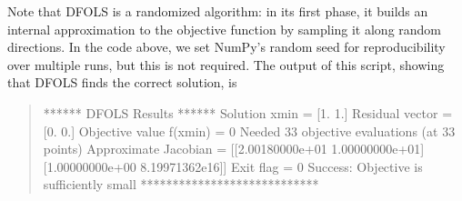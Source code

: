 \documentclass[letterpaper,10pt,english]{sphinxmanual}
\begin{document}
\begin{quote}

\begin{sphinxVerbatim}[commandchars=\\\{\}]
   
   
 

 
     \PYG{p}{[}  \PYG{p}{[}\PYG{p}{]}  \PYG{p}{[}\PYG{p}{]}     \PYG{p}{[}\PYG{p}{]}\PYG{p}{]}

  \PYG{p}{[} \PYG{p}{]}

   

\end{sphinxVerbatim}
\end{quote}

Note that DFO\sphinxhyphen{}LS is a randomized algorithm: in its first phase, it builds an internal approximation to the objective function by sampling it along random directions. In the code above, we set NumPy’s random seed for reproducibility over multiple runs, but this is not required. The output of this script, showing that DFO\sphinxhyphen{}LS finds the correct solution, is
\begin{quote}

\begin{sphinxVerbatim}[commandchars=\\\{\}]
****** DFO\PYGZhy{}LS Results ******
Solution xmin = [1. 1.]
Residual vector = [0. 0.]
Objective value f(xmin) = 0
Needed 33 objective evaluations (at 33 points)
Approximate Jacobian = [[\PYGZhy{}2.00180000e+01  1.00000000e+01]
 [\PYGZhy{}1.00000000e+00  8.19971362e\PYGZhy{}16]]
Exit flag = 0
Success: Objective is sufficiently small
****************************
\end{sphinxVerbatim}
\end{quote}
\end{document}
